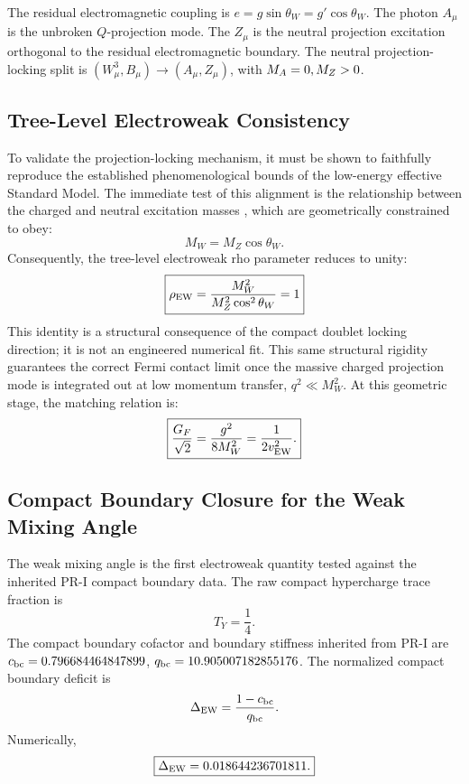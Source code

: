 \documentclass[11pt]{article}
\begin{document}
The residual electromagnetic coupling is
$e=g\sin\theta_W=g'\cos\theta_W$. The photon \(A_\mu\) is the unbroken \(Q\)-projection mode. The \(Z_\mu\) is the neutral projection excitation orthogonal to the residual electromagnetic boundary. The neutral projection-locking split is $(W_\mu^3,B_\mu) \longrightarrow (A_\mu,Z_\mu)$, with
$M_A=0, \space M_Z>0$.

\subsection{Tree-Level Electroweak Consistency}
\label{sec:pr2_tree_level_electroweak_consistency}
To validate the projection-locking mechanism, it must be shown to faithfully reproduce the established phenomenological bounds of the low-energy effective Standard Model. The immediate test of this alignment is the relationship between the charged and neutral excitation masses \cite{PDG2024}, which are geometrically constrained to obey:
\begin{equation}
M_W = M_Z\cos\theta_W.
\end{equation}
Consequently, the tree-level electroweak rho parameter reduces to unity:
\begin{equation}
\boxed{
\rho_{\rm EW}=\frac{
M_W^2
}{
M_Z^2\cos^2\theta_W 
} =1}\end{equation}
This identity is a structural consequence of the compact doublet locking direction; it is not an engineered numerical fit. This same structural rigidity guarantees the correct Fermi contact limit once the massive charged projection mode is integrated out at low momentum transfer, $q^2 \ll M_W^2$. At this geometric stage, the matching relation is:
\begin{equation}
\boxed{
\frac{G_F}{\sqrt2}=\frac{g^2}{8M_W^2}=\frac{1}{2v_{\rm EW}^2}.}\end{equation}

\subsection{Compact Boundary Closure for the Weak Mixing Angle}
\label{sec:pr2_weak_mixing_boundary_closure}

The weak mixing angle is the first electroweak quantity tested against the inherited PR-I compact boundary data. 
The raw compact hypercharge trace fraction is
\begin{equation}
T_Y=\frac14.
\end{equation}
The compact boundary cofactor and boundary stiffness inherited from PR-I are
$c_{\rm bc}=0.796684464847899$, $q_{\rm bc} = 10.905007182855176$. The normalized compact boundary deficit is
\begin{equation}
\Delta_{\rm EW}
=
\frac{1-c_{\rm bc}}{q_{\rm bc}}.
\end{equation}
Numerically,
\begin{equation}
\boxed{
\Delta_{\rm EW}
=
0.018644236701811.
}
\end{equation}
\end{document}
